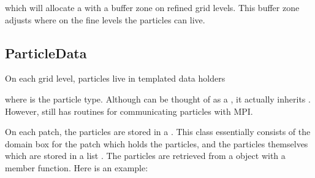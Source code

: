 \documentclass[letterpaper,10pt,english]{sphinxmanual}
\begin{document}
which will allocate a  with a buffer zone on refined grid levels.
This buffer zone adjusts where on the fine levels the particles can live.


\subsection{ParticleData}
\label{\detokenize{ParticleData:particledata}}
On each grid level, particles live in templated data holders

\begin{sphinxVerbatim}[commandchars=\\\{\},formatcom=\scriptsize]
  
\end{sphinxVerbatim}

where  is the particle type.
Although  can be thought of as a , it actually inherits .
However,  still has routines for communicating particles with MPI.

On each patch, the particles are stored in a .
This class essentially consists of the domain box for the patch which holds the particles, and the particles themselves which are stored in a list .
The particles are retrieved from a  object with a  member function.
Here is an example:

\begin{sphinxVerbatim}[commandchars=\\\{\},formatcom=\scriptsize]
      
      \PYG{p}{[}\PYG{p}{]}
      

\end{sphinxVerbatim}
\end{document}

